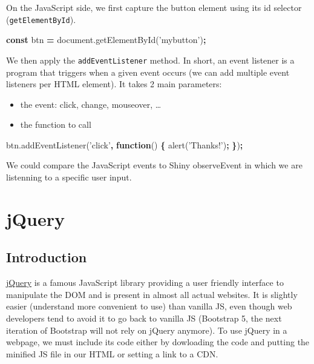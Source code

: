\documentclass[
]{book}
\newenvironment{Shaded}{\begin{snugshade}}{\end{snugshade}}
\newcommand{\AttributeTok}[1]{\textcolor[rgb]{0.77,0.63,0.00}{#1}}
\newcommand{\KeywordTok}[1]{\textcolor[rgb]{0.13,0.29,0.53}{\textbf{#1}}}
\newcommand{\NormalTok}[1]{#1}
\newcommand{\OperatorTok}[1]{\textcolor[rgb]{0.81,0.36,0.00}{\textbf{#1}}}
\newcommand{\StringTok}[1]{\textcolor[rgb]{0.31,0.60,0.02}{#1}}
\newcommand{\VariableTok}[1]{\textcolor[rgb]{0.00,0.00,0.00}{#1}}
\providecommand{\tightlist}{%
  \setlength{\itemsep}{0pt}\setlength{\parskip}{0pt}}
\begin{document}
On the JavaScript side, we first capture the button element using its id selector (\texttt{getElementById}).

\begin{Shaded}
\begin{Highlighting}[]
\KeywordTok{const}\NormalTok{ btn }\OperatorTok{=} \VariableTok{document}\NormalTok{.}\AttributeTok{getElementById}\NormalTok{(}\StringTok{'mybutton'}\NormalTok{)}\OperatorTok{;}
\end{Highlighting}
\end{Shaded}

We then apply the \texttt{addEventListener} method. In short, an event listener is a program that triggers when a given event occurs (we can add multiple event listeners per HTML element). It takes 2 main parameters:

\begin{itemize}
\tightlist
\item
  the event: click, change, mouseover, \ldots{}
\item
  the function to call
\end{itemize}

\begin{Shaded}
\begin{Highlighting}[]
\VariableTok{btn}\NormalTok{.}\AttributeTok{addEventListener}\NormalTok{(}\StringTok{'click'}\OperatorTok{,} \KeywordTok{function}\NormalTok{() }\OperatorTok{\{}
  \AttributeTok{alert}\NormalTok{(}\StringTok{'Thanks!'}\NormalTok{)}\OperatorTok{;}
\OperatorTok{\}}\NormalTok{)}\OperatorTok{;}
\end{Highlighting}
\end{Shaded}

We could compare the JavaScript events to Shiny observeEvent in which we are listenning to a specific user input.

\hypertarget{jquery}{%
\section{jQuery}\label{jquery}}

\hypertarget{introduction-1}{%
\subsection{Introduction}\label{introduction-1}}

\href{https://jquery.com}{jQuery} is a famous JavaScript library providing a user friendly interface to manipulate the DOM and is present in almost all actual websites. It is slightly easier (understand more convenient to use) than vanilla JS, even though web developers tend to avoid it to go back to vanilla JS (Bootstrap 5, the next iteration of Bootstrap will not rely on jQuery anymore). To use jQuery in a webpage, we must include its code either by dowloading the code and putting the minified JS file in our HTML or setting a link to a CDN.
\end{document}
